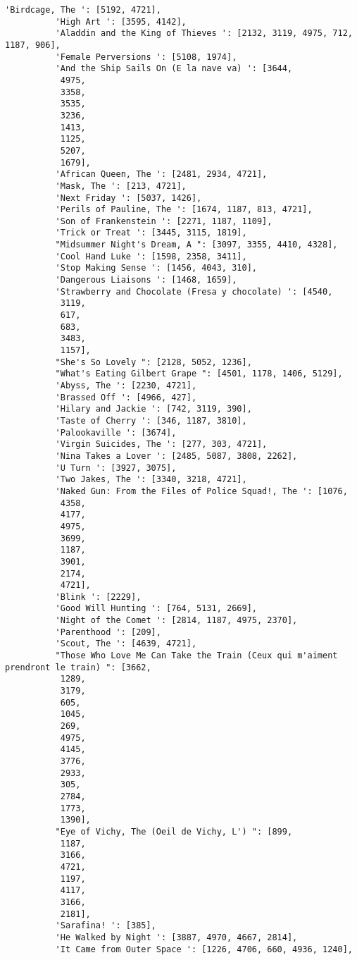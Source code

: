 \documentclass[11pt]{article}
\begin{document}
\begin{Verbatim}[commandchars=\\\{\}]
          'Birdcage, The ': [5192, 4721],
          'High Art ': [3595, 4142],
          'Aladdin and the King of Thieves ': [2132, 3119, 4975, 712, 1187, 906],
          'Female Perversions ': [5108, 1974],
          'And the Ship Sails On (E la nave va) ': [3644,
           4975,
           3358,
           3535,
           3236,
           1413,
           1125,
           5207,
           1679],
          'African Queen, The ': [2481, 2934, 4721],
          'Mask, The ': [213, 4721],
          'Next Friday ': [5037, 1426],
          'Perils of Pauline, The ': [1674, 1187, 813, 4721],
          'Son of Frankenstein ': [2271, 1187, 1109],
          'Trick or Treat ': [3445, 3115, 1819],
          "Midsummer Night's Dream, A ": [3097, 3355, 4410, 4328],
          'Cool Hand Luke ': [1598, 2358, 3411],
          'Stop Making Sense ': [1456, 4043, 310],
          'Dangerous Liaisons ': [1468, 1659],
          'Strawberry and Chocolate (Fresa y chocolate) ': [4540,
           3119,
           617,
           683,
           3483,
           1157],
          "She's So Lovely ": [2128, 5052, 1236],
          "What's Eating Gilbert Grape ": [4501, 1178, 1406, 5129],
          'Abyss, The ': [2230, 4721],
          'Brassed Off ': [4966, 427],
          'Hilary and Jackie ': [742, 3119, 390],
          'Taste of Cherry ': [346, 1187, 3810],
          'Palookaville ': [3674],
          'Virgin Suicides, The ': [277, 303, 4721],
          'Nina Takes a Lover ': [2485, 5087, 3808, 2262],
          'U Turn ': [3927, 3075],
          'Two Jakes, The ': [3340, 3218, 4721],
          'Naked Gun: From the Files of Police Squad!, The ': [1076,
           4358,
           4177,
           4975,
           3699,
           1187,
           3901,
           2174,
           4721],
          'Blink ': [2229],
          'Good Will Hunting ': [764, 5131, 2669],
          'Night of the Comet ': [2814, 1187, 4975, 2370],
          'Parenthood ': [209],
          'Scout, The ': [4639, 4721],
          "Those Who Love Me Can Take the Train (Ceux qui m'aiment prendront le train) ": [3662,
           1289,
           3179,
           605,
           1045,
           269,
           4975,
           4145,
           3776,
           2933,
           305,
           2784,
           1773,
           1390],
          "Eye of Vichy, The (Oeil de Vichy, L') ": [899,
           1187,
           3166,
           4721,
           1197,
           4117,
           3166,
           2181],
          'Sarafina! ': [385],
          'He Walked by Night ': [3887, 4970, 4667, 2814],
          'It Came from Outer Space ': [1226, 4706, 660, 4936, 1240],

\end{Verbatim}
\end{document}
